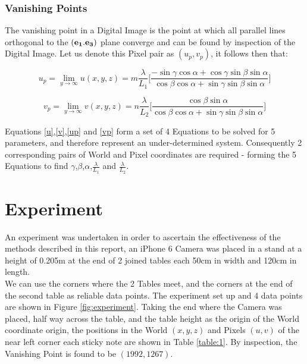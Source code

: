 \documentclass[12pt]{article}
\begin{document}
\subsubsection{Vanishing Points}

The vanishing point in a Digital Image is the point at which all parallel lines orthogonal to the  $(\textbf{e\textsubscript{1}}.\textbf{e\textsubscript{3}})$ plane converge and can be found by inspection of the Digital Image. Let us denote this Pixel pair as $(u_p, v_p)$, it follows then that:

\begin{equation}\label{up}
u_p = \lim_{y\to\infty} u(x,y,z) = m\frac{\lambda}{L_1}
\bigg[ \frac{-\sin\gamma\cos\alpha + \cos\gamma\sin\beta\sin\alpha}{\cos\beta\cos\alpha+\sin\gamma\sin\beta\sin\alpha} \bigg]
\end{equation}

\begin{equation}\label{vp}
v_p = \lim_{y\to\infty} v(x,y,z) = n\frac{\lambda}{L_2}
\bigg[ \frac{\cos\beta\sin\alpha}{\cos\beta\cos\alpha+\sin\gamma\sin\beta\sin\alpha} \bigg]
\end{equation}

Equations \ref{u},\ref{v},\ref{up} and \ref{vp} form a set of 4 Equations to be solved for 5 parameters, and therefore represent an under-determined system. Consequently 2 corresponding pairs of World and Pixel coordinates are required - forming the 5 Equations to find $\gamma$,$\beta$,$\alpha$,$\frac{\lambda}{L_1}$ and $\frac{\lambda}{L_2}$.

\section{Experiment}

An experiment was undertaken in order to ascertain the effectiveness of the methods described in this report, an iPhone 6 Camera was placed in a stand at a height of 0.205m at the end of 2 joined tables each 50cm in width and 120cm in length.\\

We can use the corners where the 2 Tables meet, and the corners at the end of the second table as reliable data points. The experiment set up and 4 data points are shown in Figure \ref{fig:experiment}. Taking the end where the Camera was placed, half way across the table, and the table height as the origin of the World coordinate origin, the positions in the World $(x,y,z)$ and Pixels $(u,v)$ of the near left corner each sticky note are shown in Table \ref{table:1}. By inspection, the Vanishing Point is found to be $(1992,1267)$. 
\newline
\end{document}
